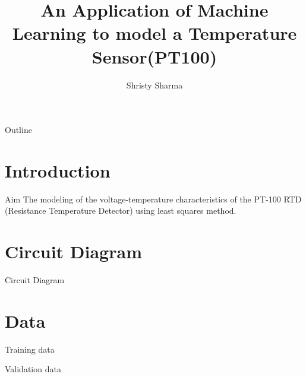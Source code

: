 \documentclass{beamer}
\title[PT-100 ]{An Application of Machine Learning to model a Temperature Sensor(PT100)}
\author{Shristy Sharma}
\theoremstyle{remark}
\begin{document}
\begin{frame}
    \titlepage 
\end{frame}

\logo{}

\begin{frame}{Outline}
    \tableofcontents
\end{frame}


\section{Introduction}
\begin{frame}{Aim}
The modeling of the voltage-temperature characteristics of the PT-100 RTD (Resistance Temperature Detector) using least squares method.

\end{frame}
\section{Circuit Diagram}
 \begin{frame}{Circuit Diagram}
 
\end{frame}

\section{Data}
 \begin{frame}{Training data}
\begin{table}[!ht]
    \centering
    \caption{Training data}
    \label{tab:Training data }
\end{table}
\end{frame}
 \begin{frame}{Validation data}
\begin{table}[!ht]
    \centering
    \caption{Validation data}
    \label{tab:Validation data}
\end{table}
\end{frame}
\end{document}
